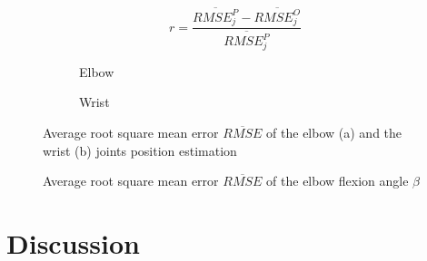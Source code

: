 \documentclass[sensors,article,submit,moreauthors,pdftex,10pt,a4paper]{mdpi}
\begin{document}
	\begin{equation}
		r = \frac{\overline{RMSE^P_j} - \overline{RMSE^O_j}}{\overline{RMSE^P_j}}
		\label{eq:results:comparison}
	\end{equation}
		
	\begin{figure}[H]
		\centering
		\begin{subfigure}[b]{0.49\textwidth}
			\centering
			
			\caption{Elbow}
			\label{fig:results:positionError:a}
		\end{subfigure} \hfill
		\begin{subfigure}[b]{0.49\textwidth}
			\centering
			
			\caption{Wrist}
			\label{fig:results:positionError:b}
		\end{subfigure}
		\caption{Average root square mean error $\overline{RMSE}$ of the elbow (a) and the wrist (b) joints position estimation}
		\label{fig:results:positionError}
	\end{figure}   
		
	\begin{figure}[H]
		\centering
		
		\caption{Average root square mean error $\overline{RMSE}$ of the elbow flexion angle $\beta$}
		\label{fig:results:elbowAngleError}
	\end{figure}
		
	\section{Discussion}
		
\end{document}
